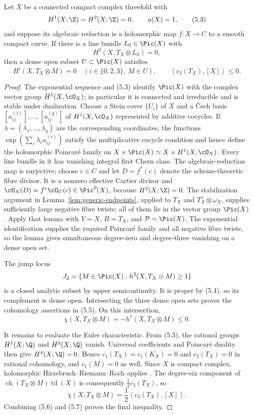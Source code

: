 \begin{theorem}
\label{thm:corrected-global}
Let $X$ be a connected compact complex threefold with
\[
 H^1(X;\Z)=H^2(X;\Z)=0,\qquad a(X)=1,
 \tag{5.3}
\]
and suppose its algebraic reduction is a holomorphic map $f:X\to C$ to a
smooth compact curve.  If there is a line bundle $L_0\in\Pic(X)$ with
\[
 H^2(X,T_X\otimes L_0)=0,
 \tag{5.4}
\]
then a dense open subset $U\subset\Pic(X)$ satisfies
\[
  H^i(X,T_X\otimes M)=0\quad(i\in\{0,2,3\},\ M\in U),
 \qquad
 \left\langle c_3(T_X),[X]\right\rangle\le0.
 \tag{5.5}
\]
\end{theorem}

\begin{proof}
The exponential sequence and (5.3) identify
\(\Pic(X)\) with the complex vector group $H^1(X,\cO_X)$; in particular it
is connected and irreducible and is stable under dualization.  Choose a Stein
cover $\{U_i\}$ of $X$ and a \v{C}ech basis
$[a^{(1)}_{ij}],\ldots,[a^{(q)}_{ij}]$ of $H^1(X,\cO_X)$ represented by additive
cocycles.  If $\lambda=(\lambda_1,\ldots,\lambda_q)$ are the corresponding
coordinates, the functions
$\exp(\sum_r\lambda_r a^{(r)}_{ij})$ satisfy the multiplicative cocycle
condition and hence define the holomorphic Poincar\'e family on
$X\times\Pic(X)\simeq X\times H^1(X,\cO_X)$.  Every
line bundle in it has vanishing integral
first Chern class.  The algebraic-reduction map is surjective; choose
$c\in C$ and let $D=f^*(c)$ denote the scheme-theoretic fibre divisor.  It is
a nonzero effective Cartier divisor and
\(\cO_X(D)=f^*\cO_C(c)\in\Pic^0(X)\), because $H^2(X;\Z)=0$.
  The stabilization argument in Lemma~\ref{lem:generic-endpoints}, applied
  to $T_X$ and $T_X^\vee\otimes\omega_X$, supplies sufficiently large
  negative fibre twists; all of them lie in the vector group $\Pic(X)$.
  Apply that lemma with $Y=X$, $B=T_X$, and $\mathcal P=\Pic(X)$.  The
  exponential identification supplies the required Poincar\'e family and all
  negative fibre twists, so the lemma gives simultaneous degree-zero and
  degree-three vanishing on a dense open set.

The jump locus
\[
 J_2=\{M\in\Pic(X):h^2(X,T_X\otimes M)\ge1\}
\]
is a closed analytic subset by upper semicontinuity.  It is proper by (5.4),
so its complement is dense open.  Intersecting the three dense open sets
proves the cohomology assertions in (5.5).  On this intersection,
\[
 \chi(X,T_X\otimes M)=-h^1(X,T_X\otimes M)\le0.
 \tag{5.6}
\]

It remains to evaluate the Euler characteristic.  From (5.3), the rational
groups $H^1(X;\Q)$ and $H^2(X;\Q)$ vanish.  Universal coefficients and
Poincar\'e duality then give $H^4(X;\Q)=0$.  Hence
  $c_1(T_X)=c_1(K_X)=0$ and $c_2(T_X)=0$ in rational cohomology, and
  $c_1(M)=0$ as well.  Since $X$ is
  compact complex, holomorphic Hirzebruch--Riemann--Roch applies \cite{Hir}.  The
degree-six component of
\(\operatorname{ch}(T_X\otimes M)\operatorname{td}(X)\) is consequently
\(\tfrac12c_3(T_X)\), so
\[
 \chi(X,T_X\otimes M)=
 \frac12\left\langle c_3(T_X),[X]\right\rangle.
 \tag{5.7}
\]
Combining (5.6) and (5.7) proves the final inequality.
\end{proof}

